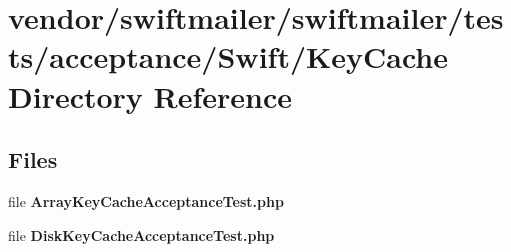 \section{vendor/swiftmailer/swiftmailer/tests/acceptance/\+Swift/\+Key\+Cache Directory Reference}
\label{dir_5bfc8a88e0c8ff4d0302e4392f409320}
\subsection*{Files}
\begin{DoxyCompactItemize}
\item 
file {\bf Array\+Key\+Cache\+Acceptance\+Test.\+php}
\item 
file {\bf Disk\+Key\+Cache\+Acceptance\+Test.\+php}
\end{DoxyCompactItemize}
